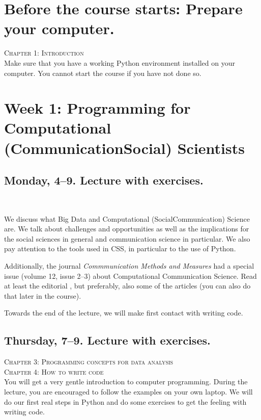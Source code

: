
\section*{Before the course starts: Prepare your computer.}

\textsc{ Chapter 1: Introduction}\\
Make sure that you have a working Python environment installed on your computer. You cannot start the course if you have not done so.

\section*{Week 1: Programming for Computational (Communication\textbar Social) Scientists}
\subsection*{Monday, 4--9. Lecture with exercises.}


\textsc{  \cite{Kitchin2014}} \\
\textsc{ \cite{Hilbert2019}}


We discuss what Big Data and Computational (Social\textbar Communication) Science are. We talk about challenges and opportunities as well as the implications for the social sciences in general and communication science in particular. We also pay attention to the tools used in CSS, in particular to the use of Python.

Additionally, the journal \textit{Commmunication Methods and Measures} had a special issue (volume 12, issue 2--3) about Computational Communication Science. Read at least the editorial \citep{VanAtteveldt2018a}, but preferably, also some of the articles (you can also do that later in the course).

Towards the end of the lecture, we will make first contact with writing code.

\subsection*{Thursday, 7--9. Lecture with exercises.}
\textsc{ Chapter 3: Programming concepts for data analysis}\\
\textsc{ Chapter 4: How to write code}\\

You will get a very gentle introduction to computer programming. During the lecture, you are encouraged to follow the examples on your own laptop.
We will do our first real steps in Python and do some exercises to get the feeling with writing code.

